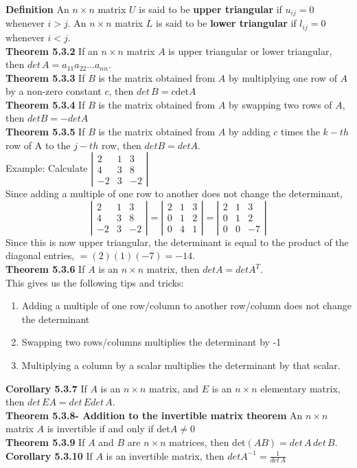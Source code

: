 \documentclass[10pt,letter]{article}
\begin{document}
\textbf{Definition} An $n\times n$ matrix $U$ is said to be \textbf{upper triangular} if $u_{ij}=0$ whenever $i>j$. An $n\times n$ matrix $L$ is said to be \textbf{lower triangular} if $l_{ij}=0$ whenever $i<j$. \\
\textbf{Theorem 5.3.2} If an $n\times n$ matrix $A$ is upper triangular or lower triangular, then $det\,A=a_{11}a_{22}\ldots a_{nn}$. \\ 
\textbf{Theorem 5.3.3} If $B$ is the matrix obtained from $A$ by multiplying one row of $A$ by a non-zero constant $c$, then $det\,B=c\text{det}A$\\ 
\textbf{Theorem 5.3.4} If $B$ is the matrix obtained from $A$ by swapping two rows of $A$, then $detB=-detA$\\ 
\textbf{Theorem 5.3.5} If $B$ is the matrix obtained from $A$ by adding $c$ times the $k-th$ row of A to the $j-th$ row, then $detB=detA$. \\ 
Example: Calculate $\left|\begin{matrix}2&1&3\\4&3&8\\-2&3&-2\end{matrix}\right|$ \\ 
Since adding a multiple of one row to another does not change the determinant, $$\left|\begin{matrix}2&1&3\\4&3&8\\-2&3&-2\end{matrix}\right|=\left|\begin{matrix}2&1&3\\0&1&2\\0&4&1\end{matrix}\right|=\left|\begin{matrix}2&1&3\\0&1&2\\0&0&-7\end{matrix}\right|$$ Since this is now upper triangular, the determinant is equal to the product of the diagonal entries, $=(2)(1)(-7)=-14$. \\ 
\textbf{Theorem 5.3.6} If $A$ is an $n\times n$ matrix, then $detA=detA^T$. \\ 
This gives us the following tips and tricks: \begin{enumerate}
    \item Adding a multiple of one row/column to another row/column does not change the determinant 
    \item Swapping two rows/columns multiplies the determinant by -1 
    \item Multiplying a column by a scalar multiplies the determinant by that scalar. 
\end{enumerate} 
\textbf{Corollary 5.3.7} If $A$ is an $n\times n$ matrix, and $E$ is an $n\times n$ elementary matrix, then $det\,EA=det\,Edet\,A$. \\ 
\textbf{Theorem 5.3.8- Addition to the invertible matrix theorem} An $n\times n$ matrix $A$ is invertible if and only if det$A\neq 0$ \\ 
\textbf{Theorem 5.3.9} If $A$ and $B$ are $n\times n$ matrices, then det$(AB)=det\,A\,det\,B$. 
\textbf{Corollary 5.3.10} If $A$ is an invertible matrix, then $detA^{-1}=\frac{1}{det\,A}$ 
\end{document}
